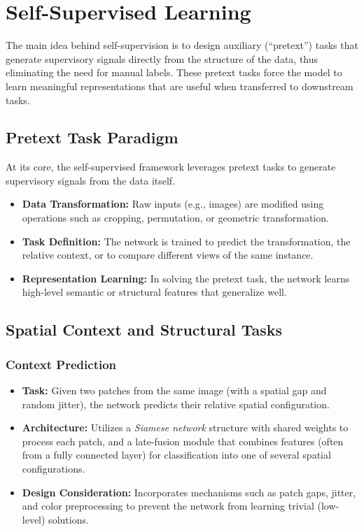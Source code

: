 \documentclass{article}
\begin{document}
\clearpage\newpage

\section{Self-Supervised Learning}

The main idea behind self-supervision is to design auxiliary (“pretext”) tasks that generate supervisory signals directly from the structure of the data, thus eliminating the need for manual labels. These pretext tasks force the model to learn meaningful representations that are useful when transferred to downstream tasks.

\subsection{Pretext Task Paradigm}

At its core, the self-supervised framework leverages pretext tasks to generate supervisory signals from the data itself.

\begin{itemize}
    \item \textbf{Data Transformation:} Raw inputs (e.g., images) are modified using operations such as cropping, permutation, or geometric transformation.
    \item \textbf{Task Definition:} The network is trained to predict the transformation, the relative context, or to compare different views of the same instance.
    \item \textbf{Representation Learning:} In solving the pretext task, the network learns high-level semantic or structural features that generalize well.
\end{itemize}

\subsection{Spatial Context and Structural Tasks}
\subsubsection{Context Prediction}
\begin{itemize}
    \item \textbf{Task:} Given two patches from the same image (with a spatial gap and random jitter), the network predicts their relative spatial configuration.
    \item \textbf{Architecture:} Utilizes a \emph{Siamese network} structure with shared weights to process each patch, and a late-fusion module that combines features (often from a fully connected layer) for classification into one of several spatial configurations.
    \item \textbf{Design Consideration:} Incorporates mechanisms such as patch gaps, jitter, and color preprocessing to prevent the network from learning trivial (low-level) solutions.
\end{itemize}
\end{document}
